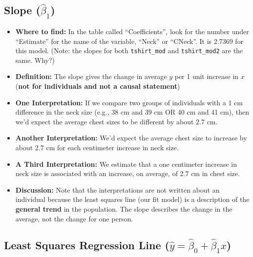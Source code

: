 \documentclass[
]{book}
\providecommand{\tightlist}{%
  \setlength{\itemsep}{0pt}\setlength{\parskip}{0pt}}
\begin{document}
\hypertarget{slope-hatbeta_1}{%
\subsection{\texorpdfstring{Slope (\(\hat{\beta}_1\))}{Slope (\textbackslash hat\{\textbackslash beta\}\_1)}}\label{slope-hatbeta_1}}

\begin{itemize}
\tightlist
\item
  \textbf{Where to find:} In the table called ``Coefficients'', look for the number under ``Estimate'' for the name of the variable, ``Neck'' or ``CNeck''. It is 2.7369 for this model. (Note: the slopes for both \texttt{tshirt\_mod} and \texttt{tshirt\_mod2} are the same. Why?)
\item
  \textbf{Definition:} The slope gives the change in average \(y\) per 1 unit increase in \(x\) (\textbf{not for individuals and not a causal statement})
\item
  \textbf{One Interpretation:} If we compare two groups of individuals with a 1 cm difference in the neck size (e.g., 38 cm and 39 cm OR 40 cm and 41 cm), then we'd expect the average chest sizes to be different by about 2.7 cm.
\item
  \textbf{Another Interpretation:} We'd expect the average chest size to increase by about 2.7 cm for each centimeter increase in neck size.
\item
  \textbf{A Third Interpretation:} We estimate that a one centimeter increase in neck size is associated with an increase, on average, of 2.7 cm in chest size.
\item
  \textbf{Discussion:} Note that the interpretations are not written about an individual because the least squares line (our fit model) is a description of the \textbf{general trend} in the population. The slope describes the change in the average, not the change for one person.
\end{itemize}

\hypertarget{least-squares-regression-line-haty-hatbeta_0-hatbeta_1x}{%
\subsection{\texorpdfstring{Least Squares Regression Line (\(\hat{y} = \hat{\beta}_0 + \hat{\beta}_1x\))}{Least Squares Regression Line (\textbackslash hat\{y\} = \textbackslash hat\{\textbackslash beta\}\_0 + \textbackslash hat\{\textbackslash beta\}\_1x)}}\label{least-squares-regression-line-haty-hatbeta_0-hatbeta_1x}}
\end{document}
